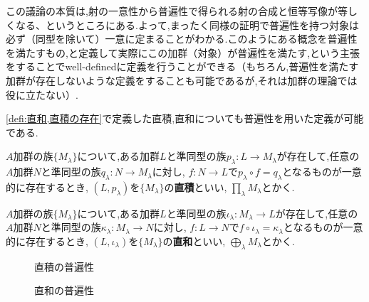 この議論の本質は,射の一意性から普遍性で得られる射の合成と恒等写像が等しくなる、というところにある.よって,まったく同様の証明で普遍性を持つ対象は必ず（同型を除いて）一意に定まることがわかる.このようにある概念を普遍性を満たすもの,と定義して実際にこの加群（対象）が普遍性を満たす,という主張をすることでwell-definedに定義を行うことができる（もちろん,普遍性を満たす加群が存在しないような定義をすることも可能であるが,それは加群の理論では役に立たない）.

\ref{defi:直和,直積の存在}で定義した直積,直和についても普遍性を用いた定義が可能である.

\begin{defi}[普遍性を用いた直積の定義]
	$A$加群の族$\{M_\lambda\}$について,ある加群$L$と準同型の族$p_\lambda:L\to M_\lambda$が存在して,任意の$A$加群$N$と準同型の族$q_\lambda:N\to M_\lambda$に対し, $f:N\to L$で$p_\lambda\circ f=q_\lambda$となるものが一意的に存在するとき, $(L,p_\lambda)$を$\{M_\lambda\}$の\textbf{直積}といい, $\prod_\lambda M_\lambda$とかく.
\end{defi}

\begin{defi}[普遍性を用いた直和の定義]
	$A$加群の族$\{M_\lambda\}$について,ある加群$L$と準同型の族$\iota_\lambda: M_\lambda\to L$が存在して,任意の$A$加群$N$と準同型の族$\kappa_\lambda: M_\lambda\to N$に対し, $f:L\to N$で$f\circ\iota_\lambda=\kappa_\lambda$となるものが一意的に存在するとき, $(L,\iota_\lambda)$を$\{M_\lambda\}$の\textbf{直和}といい, $\bigoplus_\lambda M_\lambda$とかく.
\end{defi}

\begin{minipage}{.45\textwidth}
	\begin{figure}[H]
		\centering
		\caption{直積の普遍性}
	\end{figure}
\end{minipage}
\hfill
\begin{minipage}{.45\textwidth}
	\begin{figure}[H]
		\centering
		\caption{直和の普遍性}
	\end{figure}
\end{minipage}

